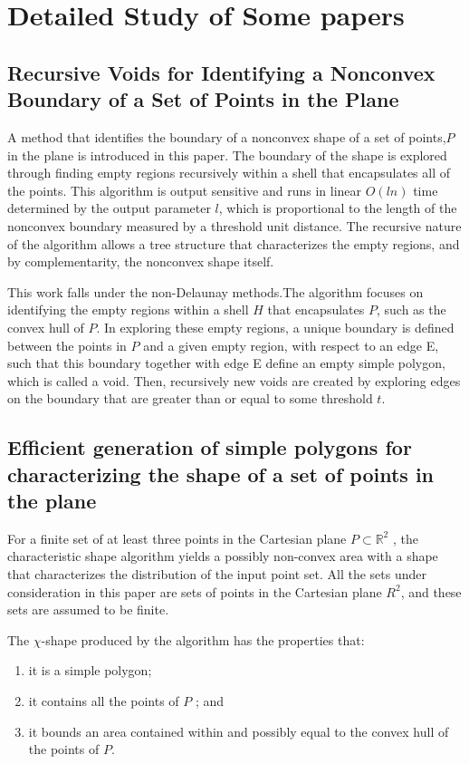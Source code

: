 \documentclass[preprint,5p,times,twocolumn]{elsarticle}
\begin{document}
\section{Detailed Study of Some papers} 
\subsection{Recursive Voids for Identifying a Nonconvex Boundary
of a Set of Points in the Plane \cite{recVoid}}

A method that identifies the boundary of a nonconvex shape of a set of points,$P$ in the plane is introduced in this paper. The boundary of the shape is explored through finding empty regions recursively within a shell that encapsulates all of the points. This algorithm is output sensitive and runs in linear $O(ln)$ time determined by the output parameter $l$, which is proportional to the length of the nonconvex boundary measured by a threshold unit distance. The recursive nature of the algorithm allows a tree structure that characterizes the empty regions, and by complementarity, the nonconvex shape itself. 

This work falls under the non-Delaunay methods.The algorithm focuses on identifying the empty regions within a shell $H$ that encapsulates $P$, such as the convex hull of $P$. In exploring these empty regions, a unique boundary is defined
between the points in $P$ and a given empty region, with respect to an edge E,
such that this boundary together with edge E define an empty simple polygon, which is called a void. Then, recursively new voids are created by exploring edges on the boundary that are greater than or equal to some threshold $t$.

\subsection{Efficient generation of simple polygons for characterizing the shape of a set of points in the plane \cite{Duckham:2008:EGS:1385702.1385955}}

For a finite set of at least three points in the Cartesian plane $P \subset \mathbb{R}^2$ , the characteristic shape algorithm yields a possibly non-convex area with a shape that characterizes the distribution of the input point set. All the sets under consideration in this paper are sets of points in the Cartesian plane ${R}^2$, and these sets are assumed to be finite. 


The $\chi$-shape produced by the algorithm has the properties that:
\begin{enumerate}
	\item it is a simple polygon;
	\item it contains all the points of $P$ ; and
 	\item it bounds an area contained within and possibly equal to the convex hull of the points of $P$.
\end{enumerate}
\end{document}
